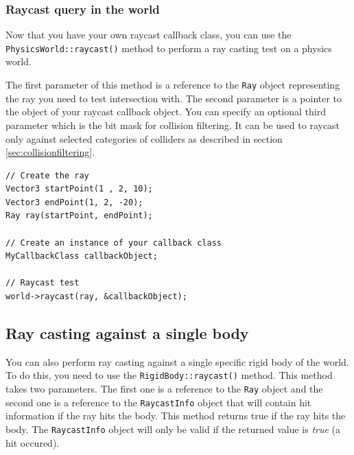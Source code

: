\documentclass[a4paper,12pt]{article}
\begin{document}
    \subsubsection{Raycast query in the world}

    \begin{sloppypar} 
    Now that you have your own raycast callback class, you can use the \texttt{PhysicsWorld::raycast()} method to perform a ray casting test
    on a physics world. \\
    \end{sloppypar} 

    The first parameter of this method is a reference to the \texttt{Ray} object representing the ray you need to test intersection with. The second parameter is a pointer to
    the object of your raycast callback object. You can specify an optional third parameter which is the bit mask for collision filtering.
    It can be used to raycast only against selected categories of colliders as described in section \ref{sec:collisionfiltering}. \\

    \begin{lstlisting}
// Create the ray
Vector3 startPoint(1 , 2, 10);
Vector3 endPoint(1, 2, -20);
Ray ray(startPoint, endPoint);

// Create an instance of your callback class
MyCallbackClass callbackObject;

// Raycast test
world->raycast(ray, &callbackObject);
    \end{lstlisting}

    \vspace{0.6cm}

    \subsection{Ray casting against a single body}

    \begin{sloppypar}

    You can also perform ray casting against a single specific rigid body of the world. To do this, you need to use the
    \texttt{RigidBody::raycast()} method. This method takes two parameters. The first one is a reference to the \texttt{Ray} object and the second one
    is a reference to the \texttt{RaycastInfo} object that will contain hit information if the ray hits the body. This method returns true if the ray hits the
    body. The \texttt{RaycastInfo} object will only be valid if the returned value is \emph{true} (a hit occured). \\

    \end{sloppypar}
\end{document}
